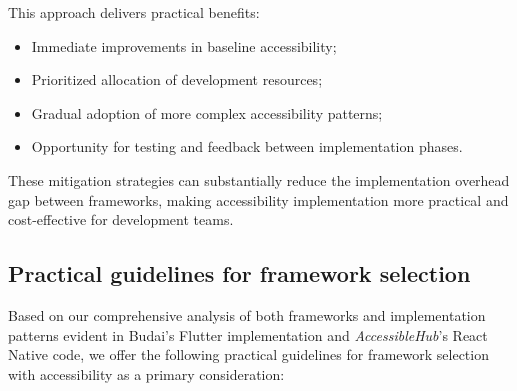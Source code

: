 \begin{enumerate}
    This approach delivers practical benefits:
    \begin{itemize}
        \item Immediate improvements in baseline accessibility;
        \item Prioritized allocation of development resources;
        \item Gradual adoption of more complex accessibility patterns;
        \item Opportunity for testing and feedback between implementation phases.
    \end{itemize}
\end{enumerate}

These mitigation strategies can substantially reduce the implementation overhead gap between frameworks, making accessibility implementation more practical and cost-effective for development teams.

\subsection{Practical guidelines for framework selection}
\label{subsec:framework-selection}

Based on our comprehensive analysis of both frameworks and implementation patterns evident in Budai's Flutter implementation and \textit{AccessibleHub}'s React Native code, we offer the following practical guidelines for framework selection with accessibility as a primary consideration:

